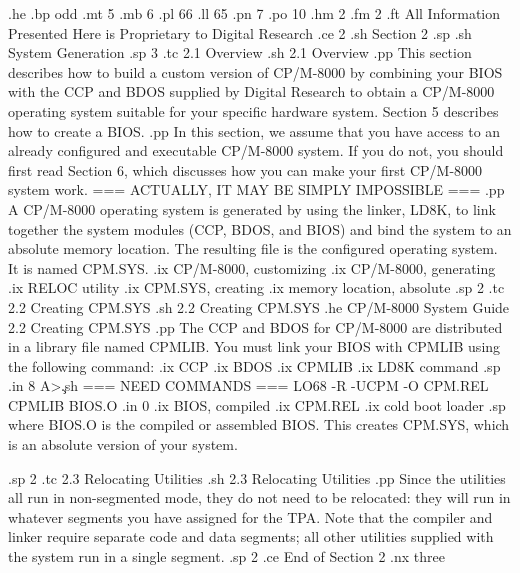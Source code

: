 
.he
.bp odd
.mt 5
.mb 6
.pl 66
.ll 65
.pn 7
.po 10
.hm 2
.fm 2
.ft All Information Presented Here is Proprietary to Digital Research
.ce 2
.sh
Section 2
.sp
.sh
System Generation
.sp 3
.tc    2.1  Overview
.sh
2.1  Overview
.pp
This section describes how to build a custom version of CP/M-8000 by combining 
your BIOS with the CCP and BDOS supplied by Digital Research to obtain a 
CP/M-8000 operating system suitable for your specific hardware system.  
Section 5 describes how to create a BIOS.
.pp
In this section, we assume that you have access to an already configured and
executable CP/M-8000 system.  If you do not, you should first read
Section 6, which discusses how you can make your first CP/M-8000 system
work.  === ACTUALLY, IT MAY BE SIMPLY IMPOSSIBLE ===
.pp
A CP/M-8000 operating system is generated by using the linker, LD8K, to 
link together the system modules (CCP, BDOS, and BIOS) and
bind the system to an absolute memory location.  
The resulting file is the configured operating system.  It is named CPM.SYS.
.ix CP/M-8000, customizing
.ix CP/M-8000, generating
.ix RELOC utility
.ix CPM.SYS, creating
.ix memory location, absolute
.sp 2
.tc    2.2  Creating CPM.SYS
.sh
2.2  Creating CPM.SYS
.he CP/M-8000 System Guide                       2.2  Creating CPM.SYS 
.pp
The CCP and BDOS for CP/M-8000 are distributed in a library file named
CPMLIB.  You must link your BIOS with CPMLIB using the following command:
.ix CCP
.ix BDOS
.ix CPMLIB
.ix LD8K command
.sp 
.in 8
A>\c
.sh
=== NEED COMMANDS ===
LO68 -R -UCPM -O CPM.REL CPMLIB BIOS.O
.in 0
.ix BIOS, compiled
.ix CPM.REL
.ix cold boot loader
.sp 
where BIOS.O is the compiled or assembled BIOS.  This creates CPM.SYS, which 
is an absolute version of your system.  

.sp 2
.tc    2.3  Relocating Utilities
.sh
2.3   Relocating Utilities
.pp
Since the utilities all run in non-segmented mode, they do not need to
be relocated:  they will run in whatever segments you have assigned
for the TPA.  Note that the compiler and linker require separate
code and data segments; all other utilities supplied with the system
run in a single segment.
.sp 2
.ce
End of Section 2
.nx three
